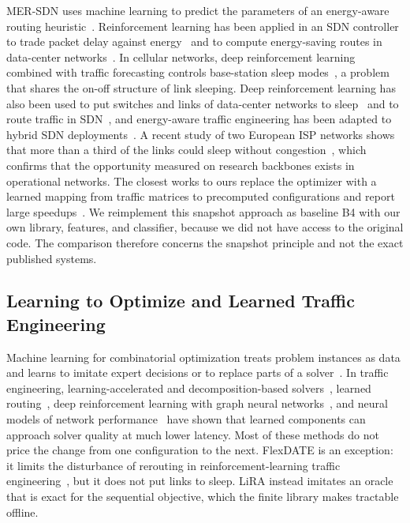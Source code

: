 \documentclass[preprint,12pt]{elsarticle}
\begin{document}
MER-SDN uses machine learning to predict the parameters of an energy-aware routing heuristic~\cite{assefa2018mersdn}. Reinforcement learning has been applied in an SDN controller to trade packet delay against energy~\cite{frohlich2021rl} and to compute energy-saving routes in data-center networks~\cite{zheng2022energysaving}. In cellular networks, deep reinforcement learning combined with traffic forecasting controls base-station sleep modes~\cite{wu2021deepbsc}, a problem that shares the on-off structure of link sleeping. Deep reinforcement learning has also been used to put switches and links of data-center networks to sleep~\cite{wang2022dcndrl} and to route traffic in SDN~\cite{pei2024drlte}, and energy-aware traffic engineering has been adapted to hybrid SDN deployments~\cite{maity2022ethos}. A recent study of two European ISP networks shows that more than a third of the links could sleep without congestion~\cite{rollin2024sleep}, which confirms that the opportunity measured on research backbones exists in operational networks. The closest works to ours replace the optimizer with a learned mapping from traffic matrices to precomputed configurations and report large speedups~\cite{gomezdelahiz2025noms,gomezdelahiz2026tgcn}. We reimplement this snapshot approach as baseline B4 with our own library, features, and classifier, because we did not have access to the original code. The comparison therefore concerns the snapshot principle and not the exact published systems.

\subsection*{Learning to Optimize and Learned Traffic Engineering}

Machine learning for combinatorial optimization treats problem instances as data and learns to imitate expert decisions or to replace parts of a solver~\cite{bengio2021mlco}. In traffic engineering, learning-accelerated and decomposition-based solvers~\cite{xu2023teal,perry2023dote,abuzaid2021ncflow,narayanan2021pop}, learned routing~\cite{valadarsky2017learning}, deep reinforcement learning with graph neural networks~\cite{almasan2022enero,bernardez2023magnneto}, and neural models of network performance~\cite{rusek2020routenet} have shown that learned components can approach solver quality at much lower latency. Most of these methods do not price the change from one configuration to the next. FlexDATE is an exception: it limits the disturbance of rerouting in reinforcement-learning traffic engineering~\cite{ye2023flexdate}, but it does not put links to sleep. LiRA instead imitates an oracle that is exact for the sequential objective, which the finite library makes tractable offline.
\end{document}

